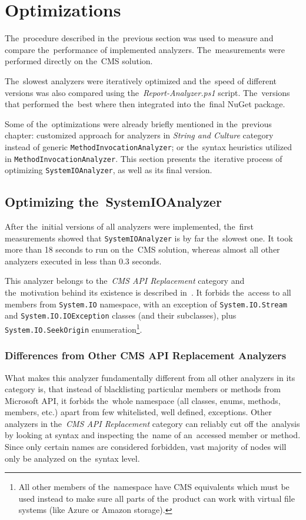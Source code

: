 \documentclass[
  digital, %
  table,   %
  lof,     %
  lot,     %
  oneside,
]{fithesis3}
\begin{document}
\section{Optimizations}
The~procedure described in the~previous section was used to measure and compare the~performance of implemented analyzers. The~measurements were performed directly on the~CMS solution.

The~slowest analyzers were iteratively optimized and the~speed of different versions was also compared using the~\textit{Report-Analyzer.ps1} script. The~versions that performed the~best where then integrated into the~final NuGet package.

Some of the~optimizations were already briefly mentioned in the~previous chapter: customized approach for analyzers in \textit{String and Culture} category instead of generic \texttt{MethodInvocationAnalyzer}; or the~syntax heuristics utilized in \texttt{MethodInvocationAnalyzer}. This section presents the~iterative process of optimizing \texttt{SystemIOAnalyzer}, as well as its final version.

\subsection{Optimizing the~SystemIOAnalyzer}
After the~initial versions of all analyzers were implemented, the~first measurements showed that \texttt{SystemIOAnalyzer} is by far the~slowest one. It took more than 18 seconds to run on the~CMS solution, whereas almost all other analyzers executed in less than 0.3 seconds.

This analyzer belongs to the~\textit{CMS API Replacement} category and the~motivation behind its existence is described in~\cite{system-io-motivation}. It forbids the~access to all members from \texttt{System.IO} namespace, with an exception of \texttt{System.IO.Stream} and \texttt{System.IO.IOException} classes (and their subclasses), plus \texttt{System.IO.SeekOrigin} enumeration\footnote{All other members of the~namespace have CMS equivalents which must be used instead to make sure all parts of the~product can work with virtual file systems (like Azure or Amazon storage).}.

\subsubsection{\textbf{Differences from Other CMS API Replacement Analyzers}}
What makes this analyzer fundamentally different from all other analyzers in its category is, that instead of blacklisting particular members or methods from Microsoft API, it forbids the~whole namespace (all classes, enums, methods, members, etc.) apart from few whitelisted, well defined, exceptions. Other analyzers in the~\textit{CMS API Replacement} category can reliably cut off the~analysis by looking at syntax and inspecting the~name of an~accessed member or method. Since only certain names are considered forbidden, vast majority of nodes will only be analyzed on the~syntax level. 
\end{document}
